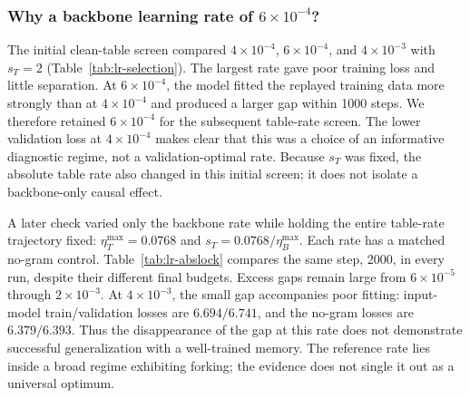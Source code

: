 \subsubsection{Why a backbone learning rate of $6\times10^{-4}$?}

The initial clean-table screen compared $4\times10^{-4}$, $6\times10^{-4}$, and $4\times10^{-3}$ with $s_T=2$ (Table~\ref{tab:lr-selection}). The largest rate gave poor training loss and little separation. At $6\times10^{-4}$, the model fitted the replayed training data more strongly than at $4\times10^{-4}$ and produced a larger gap within 1000 steps. We therefore retained $6\times10^{-4}$ for the subsequent table-rate screen. The lower validation loss at $4\times10^{-4}$ makes clear that this was a choice of an informative diagnostic regime, not a validation-optimal rate. Because $s_T$ was fixed, the absolute table rate also changed in this initial screen; it does not isolate a backbone-only causal effect.

\begin{table}[!htbp]
\centering\small
\caption{Initial rate selection with table multiplier $s_T=2$, seed 42, step 1000. Both absolute rates change across rows.}
\label{tab:lr-selection}

\end{table}

A later check varied only the backbone rate while holding the entire table-rate trajectory fixed: $\eta_T^{\max}=0.0768$ and $s_T=0.0768/\eta_B^{\max}$. Each rate has a matched no-gram control. Table~\ref{tab:lr-abslock} compares the same step, 2000, in every run, despite their different final budgets. Excess gaps remain large from $6\times10^{-5}$ through $2\times10^{-3}$. At $4\times10^{-3}$, the small gap accompanies poor fitting: input-model train/validation losses are $6.694/6.741$, and the no-gram losses are $6.379/6.393$. Thus the disappearance of the gap at this rate does not demonstrate successful generalization with a well-trained memory. The reference rate lies inside a broad regime exhibiting forking; the evidence does not single it out as a universal optimum.

\begin{table}[!htbp]
\centering\small
\caption{Backbone-rate sensitivity with $\eta_T^{\max}=0.0768$ fixed. Seed 42, raw step-2000 records; this diagnostic family evaluates every 50 steps. Train and validation columns describe the input model. Net gap subtracts the matched no-gram gap.}
\label{tab:lr-abslock}

\end{table}

